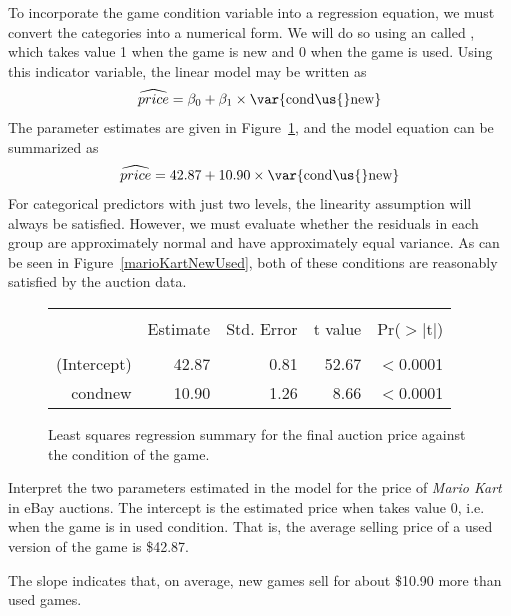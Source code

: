 To incorporate the game condition variable into a regression
equation, we must convert the categories into a numerical form.
We will do so using an 
called , which takes value 1 when the game
is new and 0 when the game is used.
Using this indicator variable, the linear model may be written as
\begin{align*}
\widehat{price} = \beta_0 + \beta_1 \times \text{\var{cond\us{}new}}
\end{align*}
The parameter estimates are given in
Figure~\ref{marioKartNewUsedRegrSummary},
and the model equation can be summarized as
\begin{align*}
\widehat{price} = 42.87 + 10.90 \times \text{\var{cond\us{}new}}
\end{align*}
For categorical predictors with just two levels,
the linearity assumption will always be satisfied.
However, we must evaluate whether the residuals in
each group are approximately normal and have approximately
equal variance.
As can be seen in Figure~\ref{marioKartNewUsed},
both of these conditions are reasonably satisfied
by the auction data.

\begin{figure}
\centering
\begin{tabular}{rrrrr}
  \hline
  \vspace{-3.7mm} & & & & \\
 & Estimate & Std. Error & t value & Pr($>$$|$t$|$) \\ 
  \hline
  \vspace{-3.6mm} & & & & \\
(Intercept) & 42.87 & 0.81 & 52.67 & $<$0.0001 \\ 
  cond\us{}new & 10.90 & 1.26 & 8.66 & $<$0.0001 \\ 
   \hline
\end{tabular}
\caption{Least squares regression summary for the final auction price against the condition of the game.}
\label{marioKartNewUsedRegrSummary}
\end{figure}

\begin{examplewrap}
\begin{nexample}{Interpret the two parameters estimated in the
    model for the price of \emph{Mario Kart} in eBay auctions.}
  The intercept is the estimated price when 
  takes value 0, i.e. when the game is in used condition.
  That is, the average selling price of a used version of
  the game is \$42.87.

  The slope indicates that, on average, new games sell for
  about \$10.90 more than used games.
\end{nexample}
\end{examplewrap}

